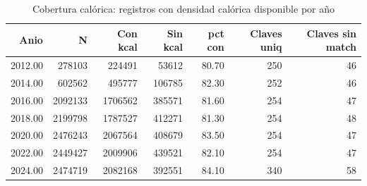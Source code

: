 \begin{table}[ht]
\centering
\caption{Cobertura cal\'orica: registros con densidad cal\'orica disponible por a\~{n}o} 
\label{tab:03a_cobertura_kcal_anio}
\begin{tabular}{rrrrrrr}
  \toprule
Anio & N & Con kcal & Sin kcal & pct con & Claves uniq & Claves sin match \\ 
  \midrule
2012.00 & 278103 & 224491 & 53612 & 80.70 & 250 &  46 \\ 
  2014.00 & 602562 & 495777 & 106785 & 82.30 & 252 &  46 \\ 
  2016.00 & 2092133 & 1706562 & 385571 & 81.60 & 254 &  47 \\ 
  2018.00 & 2199798 & 1787527 & 412271 & 81.30 & 254 &  48 \\ 
  2020.00 & 2476243 & 2067564 & 408679 & 83.50 & 254 &  47 \\ 
  2022.00 & 2449427 & 2009906 & 439521 & 82.10 & 254 &  47 \\ 
  2024.00 & 2474719 & 2082168 & 392551 & 84.10 & 340 &  58 \\ 
   \bottomrule
\end{tabular}
\end{table}
